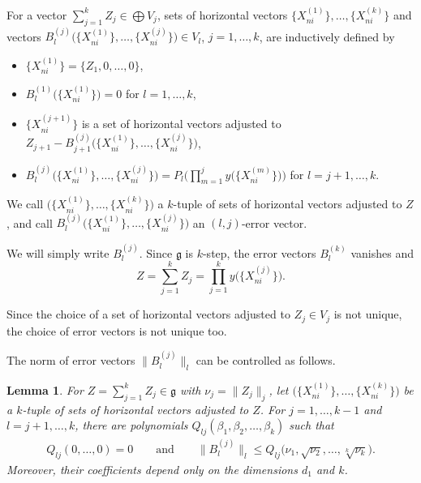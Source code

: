 \documentclass[pdftex]{sigma}
\numberwithin{equation}{section}
\newtheorem{Lemma}[Theorem]{Lemma}
\newcommand{\g}{\mathfrak{g}}
\begin{document}
\begin{Definition}
 For a vector $\sum_{j=1}^k Z_j\in\bigoplus V_j$,
 sets of horizontal vectors $\bigl\{X_{ni}^{(1)}\bigr\},\dots,\bigl\{X_{ni}^{(k)}\bigr\}$ and vectors $B_l^{(j)}\bigl(\bigl\{X_{ni}^{(1)}\bigr\},\dots,\bigl\{X_{ni}^{(j)}\bigr\}\bigr)\in V_l$, $j=1,\dots,k$, are inductively defined by
 \begin{itemize}\itemsep=0pt
 \item[(X1)] $\bigl\{X_{ni}^{(1)}\bigr\}=\{Z_1,0,\dots,0\}$,
 \item[(B1)] $B_l^{(1)}\bigl(\bigl\{X_{ni}^{(1)}\bigr\}\bigr)=0$ for $l=1,\dots,k$,
 \item[(Xj)] $\bigl\{X_{ni}^{(j+1)}\bigr\}$ is a set of horizontal vectors adjusted to $Z_{j+1}-B_{j+1}^{(j)}\big(\bigl\{X_{ni}^{(1)}\bigr\},\dots,\bigl\{X_{ni}^{(j)}\bigr\}\big)$,
 \item[(Bj)] $B_l^{(j)}\big(\bigl\{X_{ni}^{(1)}\bigr\},\dots,\bigl\{X_{ni}^{(j)}\bigr\}\big) =P_l\big(\prod_{m=1}^jy\big(\bigl\{X_{ni}^{(m)}\bigr\}\big)\big)$ for $l=j+1,\dots,k$.
 \end{itemize}
 We call $\big(\bigl\{X_{ni}^{(1)}\bigr\},\dots,\bigl\{X_{ni}^{(k)}\bigr\}\big)$ a $k$-tuple of sets of horizontal vectors adjusted to $Z$,
 and call $B_{l}^{(j)}\big(\bigl\{X_{ni}^{(1)}\bigr\},\dots,\bigl\{X_{ni}^{(j)}\bigr\}\big)$ an $(l,j)$-error vector.
\end{Definition}

We will simply write $B_l^{(j)}$.
Since $\g$ is $k$-step,
the error vectors $B_l^{(k)}$ vanishes and
\[
Z=\sum_{j=1}^k Z_j=\prod_{j=1}^ky\big(\bigl\{X_{ni}^{(j)}\bigr\}\big).
\]

\begin{Remark}
 Since the choice of a set of horizontal vectors adjusted to $Z_j\in V_j$ is not unique,
 the choice of error vectors is not unique too.
\end{Remark}

The norm of error vectors $\big\|B_l^{(j)}\big\|_l$ can be controlled as follows.

\begin{Lemma}\label{lempolynomial}
 For $Z=\sum_{j=1}^k Z_j\in\g$ with $\nu_j=\|Z_j\|_j$,
 let $\big(\bigl\{X_{ni}^{(1)}\bigr\},\dots,\bigl\{X_{ni}^{(k)}\bigr\}\big)$ be a $k$-tuple of sets of horizontal vectors adjusted to $Z$.
 For $j=1,\dots,k-1$ and $l=j+1,\dots,k$,
 there are polynomials $Q_{lj}(\beta_1,\beta_2,\dots,\beta_k)$ such that
 \begin{gather*}
 Q_{lj}(0,\dots,0)=0\qquad \text{and}\qquad
 \bigl\|B_l^{(j)}\bigr\|_l\leq Q_{lj}\big(\nu_1,\sqrt{\nu_2},\dots,\sqrt[k]{\nu_k}\big).
 \end{gather*}
 Moreover, their coefficients depend only on the dimensions $d_1$ and $k$.
\end{Lemma}
\end{document}

